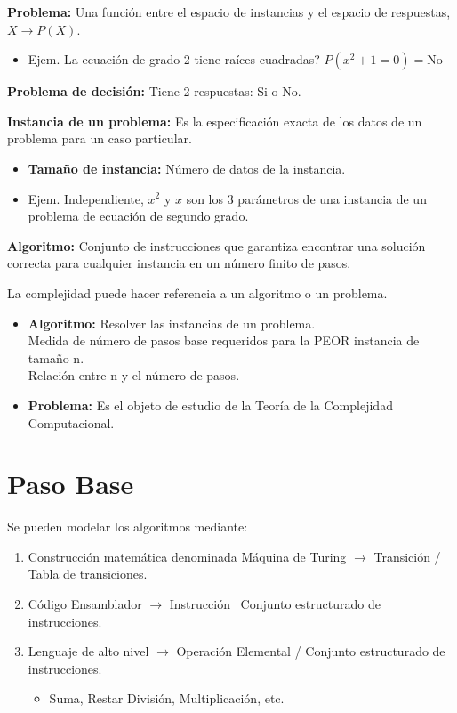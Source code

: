 \textbf{Problema:} Una función entre el espacio de instancias y el espacio de respuestas, $X \rightarrow P(X)$.
\begin{itemize}
  \item Ejem. La ecuación de grado 2 tiene raíces cuadradas? $P(x^2+1=0)=\text{No}$
\end{itemize}

\textbf{Problema de decisión:} Tiene 2 respuestas: Si o No.

\textbf{Instancia de un problema:} Es la especificación exacta de los datos de un problema para un caso particular.
\begin{itemize}
  \item \textbf{Tamaño de instancia:} Número de datos de la instancia.
  \item Ejem. Independiente, $x^2$ y $x$ son los 3 parámetros de una instancia de un problema de ecuación de segundo grado.
\end{itemize}

\textbf{Algoritmo:} Conjunto de instrucciones que garantiza encontrar una solución correcta para cualquier instancia en un número finito de pasos.

La complejidad puede hacer referencia a un algoritmo o un problema.
\begin{itemize}
  \item \textbf{Algoritmo:} Resolver las instancias de un problema. \\ Medida de número de pasos base requeridos para la PEOR instancia de tamaño n. \\ Relación entre n y el número de pasos.
  \item \textbf{Problema:} Es el objeto de estudio de la Teoría de la Complejidad Computacional.
\end{itemize}

\section{Paso Base}\label{sec:paso-base}
Se pueden modelar los algoritmos mediante:
\begin{enumerate}
    \item Construcción matemática denominada Máquina de Turing $\rightarrow$ Transición / Tabla de transiciones.
  \item Código Ensamblador $\rightarrow$ Instrucción \ Conjunto estructurado de instrucciones.
  \item Lenguaje de alto nivel $\rightarrow$ Operación Elemental / Conjunto estructurado de instrucciones.
    \begin{itemize}
      \item Suma, Restar División, Multiplicación, etc.
    \end{itemize}
\end{enumerate}

